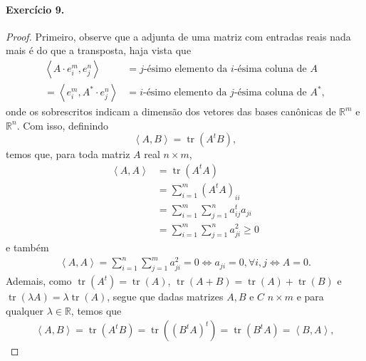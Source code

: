 \documentclass[12pt,a4paper]{article}
\DeclareMathOperator{\tr}{tr}
\newcommand{\R}{\mathbb{R}}
\begin{document}
\paragraph{Exercício 9.}
    \begin{proof}
        Primeiro, observe que a adjunta de uma matriz com entradas reais nada mais
        é do que a transposta, haja vista que
        \begin{align*}
            \left\langle A\cdot e_i^{m}, e_j^{n} \right\rangle
            &= j\text{-ésimo elemento da } i \text{-ésima coluna de } A \\
            = \left\langle e_i^{m}, A^*\cdot e_j^{n} \right\rangle
            &= i\text{-ésimo elemento da } j \text{-ésima coluna de } A^*,
        \end{align*}
        onde os sobrescritos indicam a dimensão dos vetores das bases canônicas de $\R^m$ e $\R^n$.
        Com isso, definindo
        \begin{equation*}
            \left\langle A,B \right\rangle = \tr(A^tB),
        \end{equation*}
        temos que, para toda matriz $A$ real $n\times m$,
        \begin{align*}
            \left\langle A,A \right\rangle &= \tr(A^tA) \\
                                           &= \sum_{i=1}^m (A^tA)_{ii} \\
                                           &= \sum_{i=1}^{m}\sum_{j=1}^{n} a^t_{ij}a_{ji} \\
                                           &= \sum_{i=1}^{m}\sum_{j=1}^{n} a^2_{ji} \geq 0
        \end{align*}
        e também
        \begin{align*}
            \left\langle A,A \right\rangle = \sum_{i=1}^{n}\sum_{j=1}^{m} a^2_{ji} = 0
            \iff a_{ji} = 0, \forall i,j \iff A = 0.
        \end{align*}
        Ademais, como $\tr(A^t) = \tr(A)$, $\tr(A+B) = \tr(A)+\tr(B)$ e 
        $\tr(\lambda A) = \lambda\tr(A)$, segue que dadas matrizes $A,B$ e $C$ $n\times m$ e
        para qualquer $\lambda\in\R$, temos que
        \begin{align*}
            \left\langle A,B \right\rangle = \tr(A^tB) 
            = \tr((B^tA)^t)
            = \tr(B^tA)
            = \left\langle B,A \right\rangle,
        \end{align*}

\end{proof}
\end{document}
